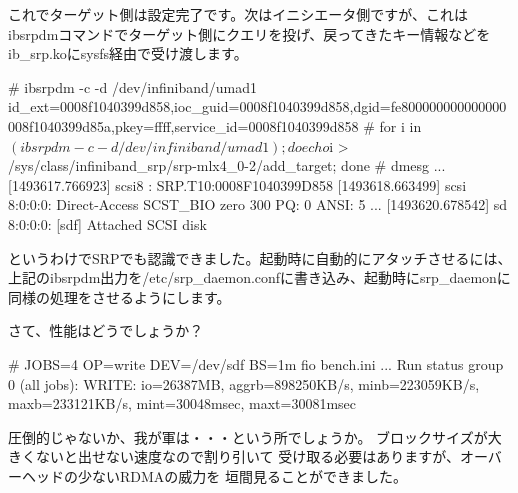 \documentclass[mingoth,a4paper]{jsarticle}
\begin{document}
これでターゲット側は設定完了です。次はイニシエータ側ですが、これは
ibsrpdmコマンドでターゲット側にクエリを投げ、戻ってきたキー情報などを
ib\_srp.koにsysfs経由で受け渡します。

\begin{commandline}
# ibsrpdm -c -d /dev/infiniband/umad1
id_ext=0008f1040399d858,ioc_guid=0008f1040399d858,dgid=fe800000000000000008f1040399d85a,pkey=ffff,service_id=0008f1040399d858
# for i in $(ibsrpdm -c -d /dev/infiniband/umad1); do echo $i > /sys/class/infiniband_srp/srp-mlx4_0-2/add_target; done
# dmesg
...
[1493617.766923] scsi8 : SRP.T10:0008F1040399D858
[1493618.663499] scsi 8:0:0:0: Direct-Access     SCST_BIO zero              300 PQ: 0 ANSI: 5
...
[1493620.678542] sd 8:0:0:0: [sdf] Attached SCSI disk
\end{commandline}

というわけでSRPでも認識できました。起動時に自動的にアタッチさせるには、
上記のibsrpdm出力を/etc/srp\_daemon.confに書き込み、起動時にsrp\_daemonに
同様の処理をさせるようにします。

さて、性能はどうでしょうか？

\begin{commandline}
# JOBS=4 OP=write DEV=/dev/sdf BS=1m fio bench.ini
...
Run status group 0 (all jobs):
  WRITE: io=26387MB, aggrb=898250KB/s, minb=223059KB/s, maxb=233121KB/s, mint=30048msec, maxt=30081msec
\end{commandline}

圧倒的じゃないか、我が軍は・・・という所でしょうか。
ブロックサイズが大きくないと出せない速度なので割り引いて
受け取る必要はありますが、オーバーヘッドの少ないRDMAの威力を
垣間見ることができました。
\end{document}
